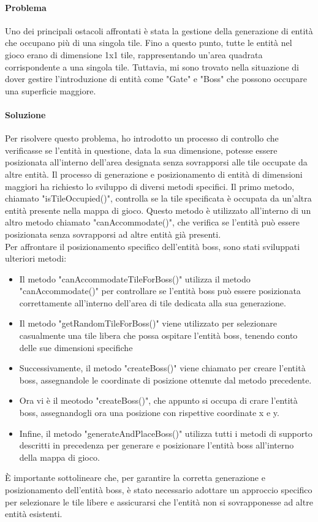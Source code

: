 \documentclass[a4paper,12pt]{report}
\begin{document}
\paragraph*{Problema}
Uno dei principali ostacoli affrontati è stata la gestione della generazione di entità che occupano più di una singola tile. 
Fino a questo punto, tutte le entità nel gioco erano di dimensione 1x1 tile, rappresentando un'area quadrata corrispondente a una singola tile. 
Tuttavia, mi sono trovato nella situazione di dover gestire l'introduzione di entità come "Gate" e "Boss" che possono occupare una superficie maggiore.
\paragraph*{Soluzione}
Per risolvere questo problema, ho introdotto un processo di controllo che verificasse se l'entità in questione, data la sua dimensione, potesse essere posizionata all'interno dell'area designata senza sovrapporsi alle tile occupate da altre entità.
Il processo di generazione e posizionamento di entità di dimensioni maggiori ha richiesto lo sviluppo di diversi metodi specifici.
Il primo metodo, chiamato "isTileOccupied()", controlla se la tile specificata è occupata da un'altra entità presente nella mappa di gioco.
Questo metodo è utilizzato all'interno di un altro metodo chiamato "canAccommodate()", che verifica se l'entità può essere posizionata senza sovrapporsi ad altre entità già presenti.
\\
Per affrontare il posizionamento specifico dell'entità boss, sono stati sviluppati ulteriori metodi:
\begin{itemize}
	\item Il metodo "canAccommodateTileForBoss()" utilizza il metodo "canAccommodate()" per controllare se l'entità boss può essere posizionata correttamente all'interno dell'area di tile dedicata alla sua generazione.
	\item Il metodo "getRandomTileForBoss()" viene utilizzato per selezionare casualmente una tile libera che possa ospitare l'entità boss, tenendo conto delle sue dimensioni specifiche
	\item Successivamente, il metodo "createBoss()" viene chiamato per creare l'entità boss, assegnandole le coordinate di posizione ottenute dal metodo precedente.
	\item Ora vi è il meotodo "createBoss()", che appunto si occupa di crare l'entità boss, assegnandogli ora una posizione con rispettive coordinate x e y.
	\item Infine, il metodo "generateAndPlaceBoss()" utilizza tutti i metodi di supporto descritti in precedenza per generare e posizionare l'entità boss all'interno della mappa di gioco.
\end{itemize}
È importante sottolineare che, per garantire la corretta generazione e posizionamento dell'entità boss, è stato necessario adottare un approccio specifico per selezionare le tile libere e assicurarsi che l'entità non si sovrapponesse ad altre entità esistenti.
\end{document}
